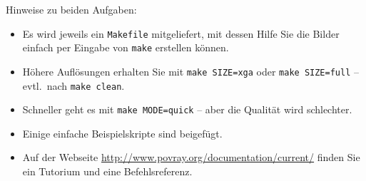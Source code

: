 \item[] Hinweise zu beiden Aufgaben:
%
\begin{itemize}
\item Es wird jeweils ein \texttt{Makefile} mitgeliefert, mit dessen 
      Hilfe Sie die Bilder einfach per Eingabe von \texttt{make} 
      erstellen können.
\item Höhere Auf\/lösungen erhalten Sie mit \texttt{make SIZE=xga}
      oder \texttt{make SIZE=full} – evtl.\ nach \texttt{make clean}.
\item Schneller geht es mit \texttt{make MODE=quick} – aber die
      Qualität wird schlechter.
\item Einige einfache Bei\-spiel\-skrip\-te sind beigefügt.
\item Auf der Webseite
      \href{http://www.povray.org/documentation/current/}{%
      http://www.povray.org/documentation/current/} finden Sie ein 
      Tutorium und eine Befehlsreferenz.
\end{itemize} 
